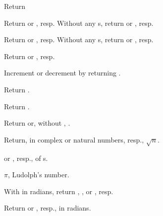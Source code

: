 \begin{LIST}{1cm}

  Return 

  Return  or , resp. Without any
  s, return  or , resp.

  Return  or , resp. Without any
  s, return  or , resp.

   Return  or
  , resp.

  Increment or
  decrement  by  returning .

   Return .

   Return .

  Return  or,
  without , .

  Return, in complex or natural numbers, resp., $\sqrt{n}$.

   or , resp., of s. 

  $\pi$, Ludolph's number.

  With  in radians, return , , or , resp.

  Return  or , resp., in radians.


\end{LIST}
